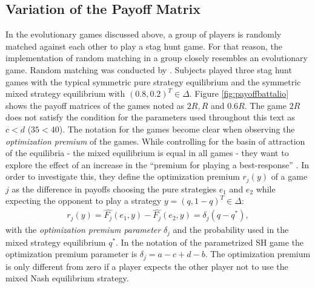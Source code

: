 \subsection{Variation of the Payoff Matrix}
In the evolutionary games discussed above, a group of players is randomly
matched against each other to play a stag hunt game. For that reason, the
implementation of random matching in a group closely resembles an 
evolutionary game.
Random matching was conducted by \textcite{battalio_optimization_2001}. 
Subjects played three stag hunt games with the typical symmetric pure strategy
equilibrium and the symmetric mixed strategy equilibrium with $(0.8,0.2)^T \in
\Delta$. Figure \ref{fig:payoffbattalio} shows the payoff matrices of the
games noted as $2R, R$ and $0.6R$. The game $2R$ does not satisfy the
condition for the parameters used throughout this text as $c<d$ ($35<40$).
The notation for the games become clear when observing the 
\textit{optimization premium} of the games. While controlling for the basin of 
attraction of the equilibria - the mixed equilibrium is equal in all games -
they want to explore the effect of an increase in the ``premium for playing
a best-response'' \parencite[751]{battalio_optimization_2001}. 
In order to investigate this, they define the optimization premium $r_j(y)$ of 
a game $j$ as the difference in payoffs choosing the pure strategies 
$e_1$ and $e_2$ while expecting the opponent to play a strategy 
$y=(q,1-q)^T \in \Delta$:
\begin{align}
        r_j(y)= \hat{F_j}(e_1,y) - \hat{F_j}(e_2,y) = \delta_j(q-q^*),
\end{align}
with the \textit{optimization premium parameter} $\delta_j$ and the 
probability used in the mixed strategy equilibrium $q^*$. In the notation
of the parametrized SH game the optimization premium parameter is 
$\delta_j = a - c + d - b$. The optimization
premium is only different from zero if a player expects the other player not
to use the mixed Nash equilibrium strategy.

